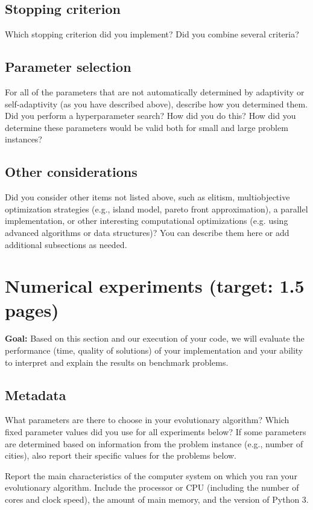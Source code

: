 \documentclass[a4paper,10pt]{article}
\newcommand{\ReplaceMe}[1]{{\color{blue}#1}}
\newcommand{\RemoveMe}[1]{{\color{purple}#1}}
\begin{document}
\subsection{Stopping criterion}

\ReplaceMe{Which stopping criterion did you implement? Did you combine several criteria?}

\subsection{Parameter selection}

\ReplaceMe{For all of the parameters that are not automatically determined by adaptivity or self-adaptivity (as you have described above), describe how you determined them. Did you perform a hyperparameter search? How did you do this? How did you determine these parameters would be valid both for small and large problem instances?}

\subsection{Other considerations}\label{sec_oth}

\ReplaceMe{Did you consider other items not listed above, such as elitism, multiobjective optimization strategies (e.g., island model, pareto front approximation), a parallel implementation, or other interesting computational optimizations (e.g. using advanced algorithms or data structures)? You can describe them here or add additional subsections as needed.}


\section{Numerical experiments (target: 1.5 pages)}

\RemoveMe{\textbf{Goal:} Based on this section and our execution of your code, we will evaluate the performance (time, quality of solutions) of your implementation and your ability to interpret and explain the results on benchmark problems.}

\subsection{Metadata}

\ReplaceMe{What parameters are there to choose in your evolutionary algorithm? Which fixed parameter values did you use for all experiments below? If some parameters are determined based on information from the problem instance (e.g., number of cities), also report their specific values for the problems below.

Report the main characteristics of the computer system on which you ran your evolutionary algorithm. Include the processor or CPU (including the number of cores and clock speed), the amount of main memory, and the version of Python 3.}
\end{document}
